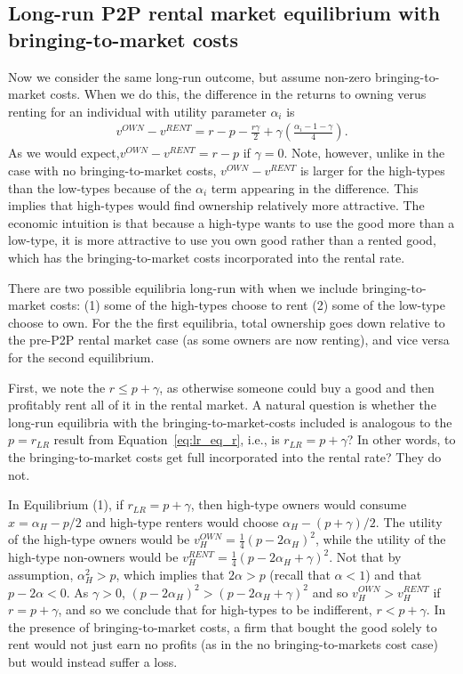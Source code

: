 \documentclass[11pt]{article}
\begin{document}
\subsection{Long-run P2P rental market equilibrium with bringing-to-market costs}
Now we consider the same long-run outcome, but assume non-zero bringing-to-market costs.
When we do this, the difference in the returns to owning verus renting for an individual with utility parameter $\alpha_i$  is 
\begin{align}
  v^{OWN} - v^{RENT} = r - p - \frac{r\gamma}{2} + \gamma \left( \frac{\alpha_i - 1 - \gamma}{4} \right). 
\end{align}
As we would expect,$v^{OWN} - v^{RENT} = r - p$ if $\gamma = 0$. 
Note, however, unlike in the case with no bringing-to-market costs, $v^{OWN} - v^{RENT}$ is larger for the high-types than the low-types because of the $\alpha_i$ term appearing in the difference.
This implies that high-types would find ownership relatively more attractive.
The economic intuition is that because a high-type wants to use the good more than a low-type, it is more attractive to use you own good rather than a rented good, which has the bringing-to-market costs incorporated into the rental rate. 

There are two possible equilibria long-run with when we include bringing-to-market costs:
(1) some of the high-types choose to rent 
(2) some of the low-type choose to own. 
For the the first equilibria, total ownership goes down relative to the pre-P2P rental market case (as some owners are now renting), and vice versa for the second equilibrium. 

First, we note the $r \le p + \gamma$, as otherwise someone could buy a good and then profitably rent all of it in the rental market.
A natural question is whether the long-run equilibria with the bringing-to-market-costs included is analogous to the $p = r_{LR}$ result from Equation~\ref{eq:lr_eq_r}, i.e., is $r_{LR} = p + \gamma$? 
In other words, to the bringing-to-market costs get full incorporated into the rental rate?
They do not. 

In Equilibrium (1), if $r_{LR} = p + \gamma$,  then high-type owners would consume $x = \alpha_H - p/2$ and high-type renters would choose $\alpha_H - (p + \gamma)/2$.
The utility of the high-type owners would be $v_H^{OWN} = \frac{1}{4}(p - 2\alpha_H)^2$, while the utility of the high-type non-owners would be $v_H^{RENT} = \frac{1}{4} \left(p - 2\alpha_H + \gamma \right)^2$.
Not that by assumption, $\alpha_H^2 > p$, which implies that $2 \alpha > p$ (recall that $\alpha < 1$) and that $p - 2\alpha < 0$.
As $\gamma > 0$, $(p - 2\alpha_H)^2 > (p - 2\alpha_H + \gamma)^2$ and so $v_H^{OWN} > v_H^{RENT}$ if $r = p + \gamma$, and so we conclude that for high-types to be indifferent, $r < p + \gamma$.
In the presence of bringing-to-market costs, a firm that bought the good solely to rent would not just earn no profits (as in the no bringing-to-markets cost case) but would instead suffer a loss. 
\end{document}
